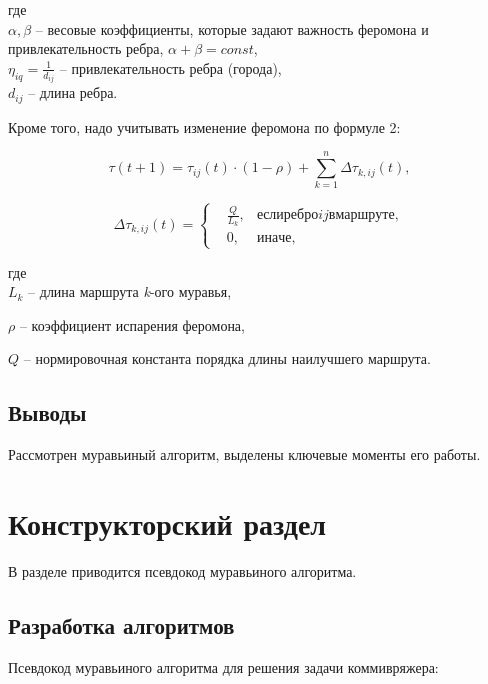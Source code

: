 \documentclass[a4paper,12pt]{article}
\begin{document}
где\\

$\alpha, \beta$ -- весовые коэффициенты, которые задают важность феромона и привлекательность ребра, $\alpha + \beta = const$, \\
$\eta_{iq} = \frac{1}{d_{ij}}$ -- привлекательность ребра (города),\\
$d_{ij}$ -- длина ребра.

Кроме того, надо учитывать изменение феромона по формуле 2: 

\begin{equation} \tau (t+1)=\tau_{ij}(t)\cdot(1-\rho)+\sum_{k=1}^n\Delta \tau_{k,ij}(t), \end{equation}

\begin{equation}
\Delta \tau_{k,ij}(t) =  
\left\{
\begin{aligned}
&\frac{Q}{L_k}, & если ребро ij в маршруте,\\
&0, & иначе,
\end{aligned}
\right.
\end{equation}

где\\

$L_k$ -- длина маршрута \textit{k}-ого муравья,

$\rho$ -- коэффициент испарения феромона,

$Q$ -- нормировочная константа порядка длины наилучшего маршрута.



\subsection*{Выводы}

Рассмотрен муравьиный алгоритм, выделены ключевые моменты его работы.


\section{Конструкторский раздел}

В разделе приводится псевдокод муравьиного алгоритма.

\subsection{Разработка алгоритмов}

Псевдокод муравьиного алгоритма для решения задачи коммивряжера:
\end{document}
